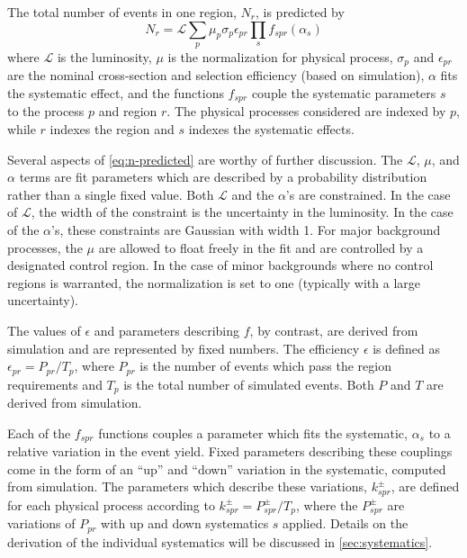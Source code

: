 The total number of events in one region, $N_r$, is predicted by
\begin{equation}
  N_r = \mathcal{L} \sum_{p} \mu_p \sigma_{p} \epsilon_{pr} \prod_{s} f_{spr}(\alpha_s)
\label{eq:n-predicted}
\end{equation}
where $\mathcal{L}$ is the luminosity, $\mu$ is the normalization for physical process, $\sigma_{p}$ and $\epsilon_{pr}$ are the nominal cross-section and selection efficiency (based on simulation), $\alpha$ fits the systematic effect, and the functions $f_{spr}$ couple the systematic parameters $s$ to the process $p$ and region $r$. The physical processes considered are indexed by $p$, while $r$ indexes the region and $s$ indexes the systematic effects.

Several aspects of \cref{eq:n-predicted} are worthy of further discussion. The $\mathcal{L}$, $\mu$, and $\alpha$ terms are fit parameters which are described by a probability distribution rather than a single fixed value.
Both $\mathcal{L}$ and the $\alpha$'s are constrained. In the case of $\mathcal{L}$, the width of the constraint is the uncertainty in the luminosity. In the case of the $\alpha$'s, these constraints are Gaussian with width 1.
For major background processes, the $\mu$ are allowed to float freely in the fit and are controlled by a designated control region. In the case of minor backgrounds where no control regions is warranted, the normalization is set to one (typically with a large uncertainty).

The values of $\epsilon$ and parameters describing $f$, by contrast, are derived from simulation and are represented by fixed numbers.
The efficiency $\epsilon$ is defined as $\epsilon_{pr} = P_{pr} / T_{p}$, where $P_{pr}$ is the number of events which pass the region requirements and $T_p$ is the total number of simulated events. Both $P$ and $T$ are derived from simulation.

Each of the $f_{spr}$ functions couples a parameter which fits the systematic, $\alpha_s$ to a relative variation in the event yield.
Fixed parameters describing these couplings come in the form of an ``up'' and ``down'' variation in the systematic, computed from simulation.
The parameters which describe these variations, $k_{spr}^{\pm}$, are defined for each physical process according to $k_{spr}^{\pm} = P^{\pm}_{spr} / T_{p}$, where the $P^{\pm}_{spr}$ are variations of $P_{pr}$ with up and down systematics $s$ applied.
Details on the derivation of the individual systematics will be discussed in \cref{sec:systematics}.

